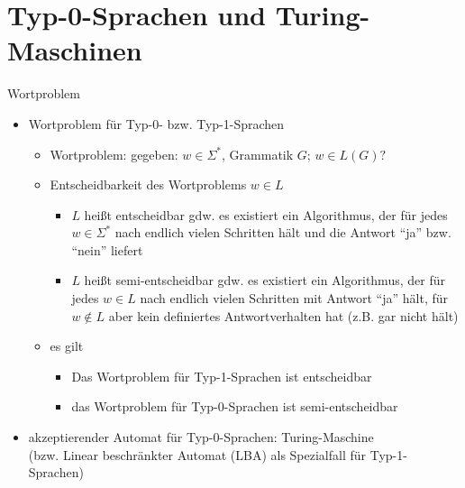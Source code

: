 \section{Typ-0-Sprachen und Turing-Maschinen}

\begin{frame}{Wortproblem}
	\begin{itemize}
		\item Wortproblem für Typ-0- bzw. Typ-1-Sprachen
		\begin{itemize}
			\item Wortproblem: gegeben: $w \in \Sigma^*$, Grammatik $G$; $w \in L(G)?$
			\item Entscheidbarkeit des Wortproblems $w \in L$
			\begin{itemize}
				\item $L$ heißt entscheidbar gdw. es existiert ein Algorithmus, der für jedes $w \in \Sigma^*$ nach endlich vielen Schritten hält und die Antwort "`ja"' bzw. "`nein"' liefert
				\item $L$ heißt semi-entscheidbar gdw. es existiert ein Algorithmus, der für jedes $w \in L$ nach endlich vielen Schritten mit Antwort "`ja"' hält, für $w \notin L$ aber kein definiertes Antwortverhalten hat (z.B. gar nicht hält)
			\end{itemize}
			\item es gilt
			\begin{itemize}
				\item Das Wortproblem für Typ-1-Sprachen ist entscheidbar
				\item das Wortproblem für Typ-0-Sprachen ist semi-entscheidbar
			\end{itemize}
		\end{itemize}
		\item akzeptierender Automat für Typ-0-Sprachen: Turing-Maschine\\
		(bzw. Linear beschränkter Automat (LBA) als Spezialfall für Typ-1-Sprachen)
	\end{itemize}
\end{frame}

